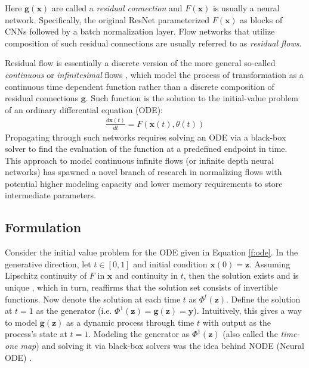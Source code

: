 Here $\mathbf{g}(\mathbf{x})$ are called a \textit{residual connection} and
$F(\mathbf{x})$ is usually a neural network. Specifically, the original
ResNet \citep{heDeepResidualLearning2016} parameterized $F(\mathbf{x})$
as blocks of CNNs followed by a batch normalization layer. Flow networks that
utilize composition of such residual connections are usually referred to as
\textit{residual flows}.

Residual flow is essentially a discrete version of the more general so-called
\textit{continuous} or \textit{infinitesimal} flows \citep{chenNeuralOrdinaryDifferential2019}, which model the process of
transformation as a continuous time dependent function rather than a discrete
composition of residual connections $\mathbf{g}$. Such function is the solution to the
initial-value problem of an ordinary differential equation (ODE):
\begin{align}
\label{f:ode}
  \frac{d \mathbf{x}(t)}{d t} =
  F(\mathbf{x}(t), \theta(t))
\end{align}
Propagating through such networks requires
solving an ODE via a black-box solver to find the evaluation of the function at
a predefined endpoint in time. This approach to model continuous
infinite flows (or infinite depth neural networks) has spawned a novel branch of
research in normalizing flows with potential higher modeling capacity and lower
memory requirements to store intermediate parameters.
\subsection{Formulation}

Consider the initial value problem for the ODE given in Equation \ref{f:ode}. In
the generative direction, let $t \in [0,1]$ and initial condition $\mathbf{x}(0)
= \mathbf{z}$. Assuming Lipschitz continuity of $F$ in $\mathbf{x}$ and
continuity in $t$, then the solution exists and is unique
\citep{arnoldOrdinaryDifferentialEquations1992}, which in turn, reaffirms that
the solution set consists of invertible functions. Now denote the solution at
each time $t$ as $\Phi^t(\mathbf{z})$. Define the solution at $t=1$ as the
generator (i.e. $\Phi^1(\mathbf{z}) = \mathbf{g}(\mathbf{z}) = \mathbf{y}$).
Intuitively, this gives a way to model $\mathbf{g}(\mathbf{z})$ as a dynamic
process through time $t$ with output as the process's state at $t=1$. Modeling
the generator as $\Phi^1(\mathbf{z})$ (also called the \textit{time-one map})
and solving it via black-box solvers was the idea behind NODE (Neural ODE)
\citep{chenNeuralOrdinaryDifferential2019}.

